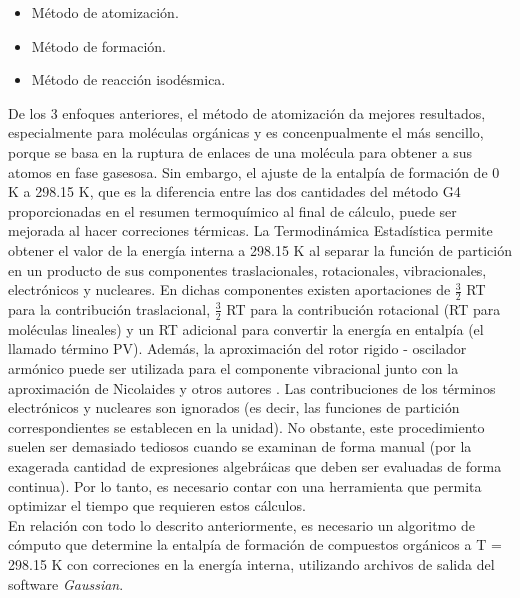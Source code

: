 \documentclass[12pt]{article}
\begin{document}
\begin{itemize}
\item Método de atomización.
\item Método de formación.
\item Método de reacción isodésmica.
\end{itemize}

De los 3 enfoques anteriores, el método de atomización da mejores resultados, especialmente para moléculas orgánicas y es concenpualmente el más sencillo, porque se basa en la ruptura de enlaces de una molécula para obtener a sus atomos en fase gasesosa\cite{Nicolaides1996}. Sin embargo, el ajuste de la entalpía de formación de 0 K a 298.15 K, que es la diferencia entre las dos cantidades del método G4 proporcionadas en el resumen termoquímico al final de cálculo, puede ser mejorada al hacer correciones térmicas. La Termodinámica Estadística permite obtener el valor de la  energía interna a 298.15 K al separar la función de partición en un producto de sus componentes traslacionales, rotacionales, vibracionales, electrónicos y nucleares\cite{McQuarrie1976, Nicolaides1996}. En dichas componentes existen aportaciones de $\frac{3}{2}$ RT para la contribución traslacional, $\frac{3}{2}$ RT para la contribución rotacional (RT para moléculas lineales) y un RT adicional para convertir la energía en entalpía (el llamado término PV). Además, la aproximación del rotor rigido - oscilador armónico puede ser utilizada para el componente vibracional junto con la aproximación de Nicolaides y otros autores \cite{McQuarrie1976, Nicolaides1996}. Las contribuciones de los términos electrónicos y nucleares son ignorados (es decir, las funciones de partición correspondientes se establecen en la unidad). No obstante, este procedimiento suelen ser demasiado tediosos cuando se examinan de forma manual (por la exagerada cantidad de expresiones algebráicas que deben ser evaluadas de forma continua). Por lo tanto, es necesario contar con una herramienta que permita optimizar el tiempo que requieren estos cálculos.\\

En relación con todo lo descrito anteriormente, es necesario un algoritmo de cómputo que determine la entalpía de formación de compuestos orgánicos a T = 298.15 K con correciones en la energía interna, utilizando archivos de salida del software \textit{Gaussian}.
 
\end{document}
